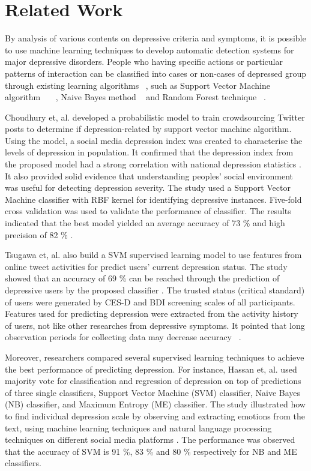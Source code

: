 \documentclass[10pt,journal,compsoc]{IEEEtran}
\begin{document}
\section{Related Work}
By analysis of various contents on depressive criteria and symptoms, it is possible to use machine learning techniques to develop automatic detection systems for major depressive disorders. People who having specific actions or particular patterns of interaction can be classified into cases or non-cases of depressed group through existing learning algorithms ~\cite{Wongkoblap},  such as Support Vector Machine algorithm ~\cite{DeChoudhury}~\cite{Tsugawa}~\cite{Peng}, Naive Bayes method ~\cite{Hassan} and Random Forest technique ~\cite{Fatima}.

Choudhury et, al. \cite{DeChoudhury} developed a probabilistic model to train crowdsourcing Twitter posts to determine if depression-related by support vector machine algorithm. Using the model, a social media depression index was created to characterise the levels of depression in population. It confirmed that the depression index from the proposed model had a strong correlation with national depression statistics \cite{DeChoudhury}. It also provided solid evidence that understanding peoples' social environment was useful for detecting depression severity. The study used a Support Vector Machine classifier with RBF kernel for identifying depressive instances. Five-fold cross validation was used to validate the performance of classifier. The results indicated that the best model yielded an average accuracy of 73 \% and high precision of 82 \% \cite{DeChoudhury}. 

Tsugawa et, al. \cite{Tsugawa} also build a SVM supervised learning model to use features from online tweet activities for predict users' current depression status. The study showed that an accuracy of 69 \% can be reached through the prediction of depressive users by the proposed classifier \cite{Tsugawa}. The trusted status (critical standard) of users were generated by CES-D and BDI screening scales of all participants. Features used for predicting depression were extracted from the activity history of users, not like other researches from depressive symptoms. It pointed that long observation periods for collecting data may decrease accuracy \cite{Tsugawa}~\cite{Reece}.  

Moreover, researchers compared several supervised learning techniques to achieve the best performance of predicting depression. For instance, Hassan et, al. \cite{Hassan} used majority vote for classification and regression of depression on top of predictions of three single classifiers, Support Vector Machine (SVM) classifier, Naive Bayes (NB) classifier, and Maximum Entropy (ME) classifier. The study illustrated how to find individual depression scale by observing and extracting emotions from the text, using machine learning techniques and natural language processing techniques on different social media platforms \cite{Hassan}. The performance was observed that the accuracy of SVM is 91 \%,  83 \% and 80 \% respectively for NB and ME classifiers.
\end{document}
